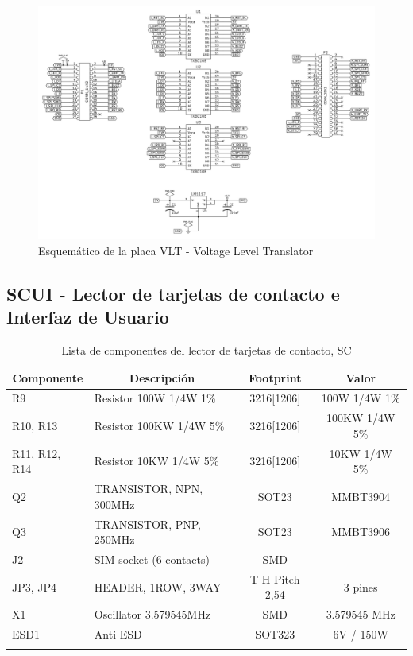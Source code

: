 \begin{figure}[H]
\centering
  \begin{center}
  \includegraphics[scale=.7]{Imagenes/vlt.png}
  \end{center}
  \caption{Esquemático de la placa VLT - Voltage Level Translator}\label{Fig:VLT} 
\end{figure}

\subsection{SCUI - Lector de tarjetas de contacto e Interfaz de Usuario}
\begin{longtable}{|l|l|c|c|}
\hline
\multicolumn{1}{|c|}{\textbf{Componente}} & \multicolumn{1}{c|}{\textbf{Descripción}} & \textbf{ Footprint} & \textbf{Valor} \\ \hline
R9 & Resistor 100W 1/4W 1\%  & 3216[1206] & 100W 1/4W  1\% \\ \hline
R10, R13 & Resistor 100KW 1/4W 5\%  & 3216[1206] & 100KW 1/4W   5\% \\ \hline
R11, R12, R14 & Resistor 10KW 1/4W 5\%  & 3216[1206] & 10KW 1/4W   5\% \\ \hline
Q2 & TRANSISTOR, NPN, 300MHz & SOT23 & MMBT3904 \\ \hline
Q3 & TRANSISTOR, PNP, 250MHz & SOT23 & MMBT3906 \\ \hline
J2 & SIM socket (6 contacts) & SMD & - \\ \hline
JP3, JP4 & HEADER, 1ROW, 3WAY & T H Pitch 2,54 & 3 pines \\ \hline
X1 & Oscillator 3.579545MHz & SMD & 3.579545 MHz \\ \hline
ESD1 & Anti ESD & SOT323 & 6V / 150W \\ \hline
\caption{Lista de componentes del lector de tarjetas de contacto, SC}
\label{}
\end{longtable}

